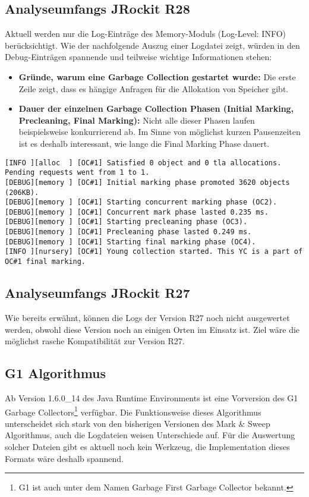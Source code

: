 \subsection{Analyseumfangs JRockit R28}\label{analyseumfang_jr28}
Aktuell werden nur die Log-Einträge des Memory-Moduls (Log-Level: INFO) berücksichtigt. Wie der nachfolgende Auszug einer Logdatei zeigt, würden in den Debug-Einträgen spannende und teilweise wichtige Informationen stehen:
\begin{itemize}
	\item \textbf{Gründe, warum eine Garbage Collection gestartet wurde:  }Die erste Zeile zeigt, dass es hängige Anfragen für die Allokation von Speicher gibt.
	\item \textbf{Dauer der einzelnen Garbage Collection Phasen (Initial Marking, Precleaning, Final Marking): } Nicht alle dieser Phasen laufen beispielsweise konkurrierend ab. Im Sinne von möglichst kurzen Pausenzeiten ist es deshalb interessant, wie lange die Final Marking Phase dauert. 
\end{itemize}

\begin{lstlisting}[caption=Garbage Collection Log (Debug Informationen)]
[INFO ][alloc  ] [OC#1] Satisfied 0 object and 0 tla allocations. Pending requests went from 1 to 1.
[DEBUG][memory ] [OC#1] Initial marking phase promoted 3620 objects (206KB).
[DEBUG][memory ] [OC#1] Starting concurrent marking phase (OC2).
[DEBUG][memory ] [OC#1] Concurrent mark phase lasted 0.235 ms.
[DEBUG][memory ] [OC#1] Starting precleaning phase (OC3).
[DEBUG][memory ] [OC#1] Precleaning phase lasted 0.249 ms.
[DEBUG][memory ] [OC#1] Starting final marking phase (OC4).
[INFO ][nursery] [OC#1] Young collection started. This YC is a part of OC#1 final marking.
\end{lstlisting}

\subsection{Analyseumfangs JRockit R27}\label{analyseumfang_jr27}
Wie bereits erwähnt, können die Logs der Version R27 noch nicht ausgewertet werden, obwohl diese Version noch an einigen Orten im Einsatz ist. Ziel wäre die möglichst rasche Kompatibilität zur Version R27.

\subsection{G1 Algorithmus}
Ab Version 1.6.0\_14 des Java Runtime Environments ist eine Vorversion des G1 Garbage Collectors\footnote{G1 ist auch unter dem Namen Garbage First Garbage Collector bekannt.} verfügbar. Die Funktionsweise dieses Algorithmus unterscheidet sich stark von den bisherigen Versionen des Mark \& Sweep Algorithmus, auch die Logdateien weisen Unterschiede auf. Für die Auswertung solcher Dateien gibt es aktuell noch kein Werkzeug, die Implementation dieses Formats wäre deshalb spannend.







